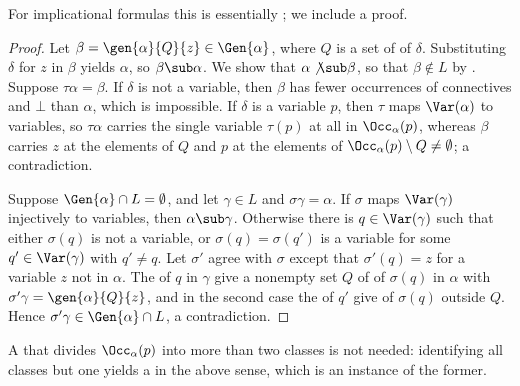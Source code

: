 For implicational formulas this is essentially \cite[Props.~3.1
and~3.2]{NM21}; we include a proof.

\begin{proof}
Let $\beta=\gen{\alpha}{Q}{z}\in\Gen{\alpha}$, where $Q$ is a set of
 of $\delta$. Substituting $\delta$ for $z$ in $\beta$ yields
$\alpha$, so $\beta\sub\alpha$. We show that $\alpha\not\sub\beta$, so that
$\beta\notin L$ by . Suppose $\tau\alpha=\beta$. If $\delta$
is not a variable, then $\beta$ has fewer occurrences of connectives and
$\bot$ than $\alpha$, which is impossible. If $\delta$ is a variable $p$,
then $\tau$ maps $\Var(\alpha)$ to variables, so $\tau\alpha$ carries the
single variable $\tau(p)$ at all  in $\Occ_\alpha(p)$, whereas
$\beta$ carries $z$ at the elements of $Q$ and $p$ at the elements of
$\Occ_\alpha(p)\setminus Q\ne\emptyset$; a contradiction.

Suppose $\Gen{\alpha}\cap L=\emptyset$, and let $\gamma\in L$ and
$\sigma\gamma=\alpha$. If $\sigma$ maps $\Var(\gamma)$ injectively to
variables, then $\alpha\sub\gamma$. Otherwise there is $q\in\Var(\gamma)$
such that either $\sigma(q)$ is not a variable, or $\sigma(q)=\sigma(q')$
is a variable for some $q'\in\Var(\gamma)$ with $q'\ne q$. Let $\sigma'$
agree with $\sigma$ except that $\sigma'(q)=z$ for a variable $z$ not in
$\alpha$. The  of $q$ in $\gamma$ give a nonempty set $Q$ of
 of $\sigma(q)$ in $\alpha$ with
$\sigma'\gamma=\gen{\alpha}{Q}{z}$, and in the second case the
 of $q'$ give  of $\sigma(q)$ outside $Q$.
Hence $\sigma'\gamma\in\Gen{\alpha}\cap L$, a contradiction.
\end{proof}

A  that divides $\Occ_\alpha(p)$ into more than two classes
is not needed: identifying all classes but one yields a  in
the above sense, which is an instance of the former.
